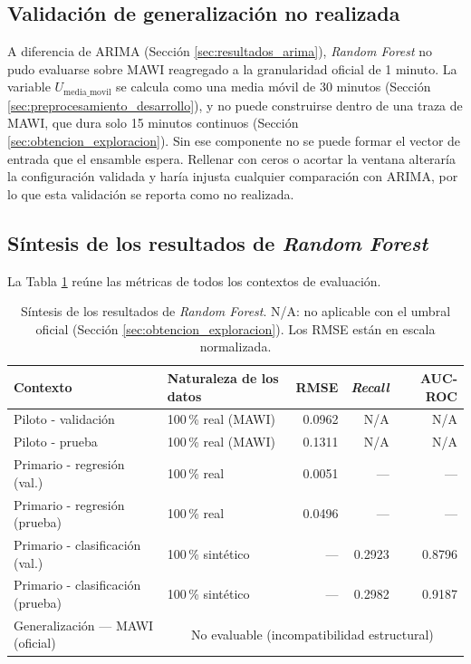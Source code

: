 \documentclass[12pt]{report}
\begin{document}
\subsection*{Validación de generalización no realizada}

A diferencia de ARIMA (Sección \ref{sec:resultados_arima}), \textit{Random Forest} no pudo evaluarse sobre MAWI reagregado a la granularidad oficial de 1 minuto. La variable $U_{\text{media\_movil}}$ se calcula como una media móvil de 30 minutos (Sección \ref{sec:preprocesamiento_desarrollo}), y no puede construirse dentro de una traza de MAWI, que dura solo 15 minutos continuos (Sección \ref{sec:obtencion_exploracion}). Sin ese componente no se puede formar el vector de entrada que el ensamble espera. Rellenar con ceros o acortar la ventana alteraría la configuración validada y haría injusta cualquier comparación con ARIMA, por lo que esta validación se reporta como no realizada.

\subsection*{Síntesis de los resultados de \textit{Random Forest}}

La Tabla \ref{tab:sintesis_completa_rf} reúne las métricas de todos los contextos de evaluación.

\begin{table}[H]
    \centering
    \small
    \begin{tabular}{|l|l|r|r|r|}
        \hline
        \textbf{Contexto} & \textbf{Naturaleza de los datos} & \textbf{RMSE} & \textbf{\textit{Recall}} & \textbf{AUC-ROC} \\
        \hline
        Piloto - validación & 100\,\% real (MAWI) & 0.0962 & N/A & N/A \\
        Piloto - prueba & 100\,\% real (MAWI) & 0.1311 & N/A & N/A \\
        Primario - regresión (val.) & 100\,\% real & 0.0051 & --- & --- \\
        Primario - regresión (prueba) & 100\,\% real & 0.0496 & --- & --- \\
        Primario - clasificación (val.) & 100\,\% sintético & --- & 0.2923 & 0.8796 \\
        Primario - clasificación (prueba) & 100\,\% sintético & --- & 0.2982 & 0.9187 \\
        Generalización --- MAWI (oficial) & \multicolumn{4}{c|}{No evaluable (incompatibilidad estructural)} \\
        \hline
    \end{tabular}
    \caption{Síntesis de los resultados de \textit{Random Forest}. N/A: no aplicable con el umbral oficial (Sección \ref{sec:obtencion_exploracion}). Los RMSE están en escala normalizada.}
    \label{tab:sintesis_completa_rf}
\end{table}
\end{document}

